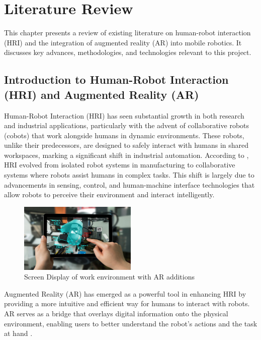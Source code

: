 \chapter{\label{ch:lit_review} Literature Review}

This chapter presents a review of existing literature on human-robot interaction (HRI) and the integration of augmented reality (AR) into mobile robotics. It discusses key advances, methodologies, and technologies relevant to this project.

\section{Introduction to Human-Robot Interaction (HRI) and Augmented Reality (AR)}

Human-Robot Interaction (HRI) has seen substantial growth in both research and industrial applications, particularly with the advent of collaborative robots (cobots) that work alongside humans in dynamic environments. These robots, unlike their predecessors, are designed to safely interact with humans in shared workspaces, marking a significant shift in industrial automation. According to \cite{Hentout2019}, HRI evolved from isolated robot systems in manufacturing to collaborative systems where robots assist humans in complex tasks. This shift is largely due to advancements in sensing, control, and human-machine interface technologies that allow robots to perceive their environment and interact intelligently.
\begin{figure}[H]
    \centering
    \includegraphics[width=0.5\textwidth]{ch2/figs/image_overlay.png}
    \caption{Screen Display of work environment with AR additions}
    \label{fig:AR_work_overlay}
\end{figure}

Augmented Reality (AR) has emerged as a powerful tool in enhancing HRI by providing a more intuitive and efficient way for humans to interact with robots. AR serves as a bridge that overlays digital information onto the physical environment, enabling users to better understand the robot’s actions and the task at hand \cite{Suzuki2022}. 

